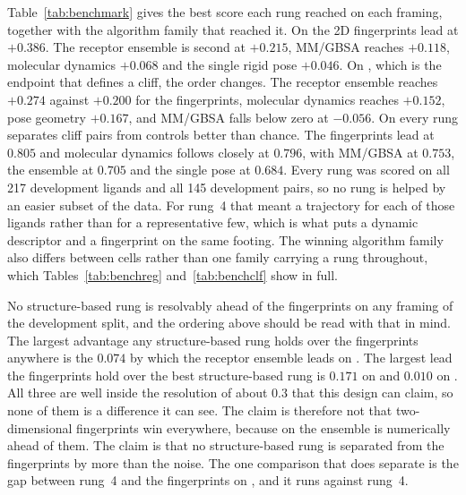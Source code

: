 Table~\ref{tab:benchmark} gives the best score each rung reached on each framing,
together with the algorithm family that reached it. On \framingA{} the 2D fingerprints
lead at $+0.386$. The receptor ensemble is second at $+0.215$, MM/GBSA reaches
$+0.118$, molecular dynamics $+0.068$ and the single rigid pose $+0.046$. On
\framingB{}, which is the endpoint that defines a cliff, the order changes. The
receptor ensemble reaches $+0.274$ against $+0.200$ for the fingerprints, molecular
dynamics reaches $+0.152$, pose geometry $+0.167$, and MM/GBSA falls below zero at
$-0.056$. On \framingC{} every rung separates cliff pairs from controls better than
chance. The fingerprints lead at $0.805$ and molecular dynamics follows closely at
$0.796$, with MM/GBSA at $0.753$, the ensemble at $0.705$ and the single pose at
$0.684$. Every rung was scored on all 217 development ligands and all 145 development
pairs, so no rung is helped by an easier subset of the data. For rung~4 that meant a
trajectory for each of those ligands rather than for a representative few, which is
what puts a dynamic descriptor and a fingerprint on the same footing. The winning algorithm
family also differs between cells rather than one family carrying a rung throughout,
which Tables~\ref{tab:benchreg} and~\ref{tab:benchclf} show in full.

\begin{table}[tb]
  \centering
  \caption{\textbf{Best score per rung on each framing}, over the rung's descriptor
    arms and the algorithm families, with the winning family in parentheses. The full
    grid is in the supplementary tables.}
  \label{tab:benchmark}
  
\end{table}

No structure-based rung is resolvably ahead of the fingerprints on any framing of the
development split, and the ordering above should be read with that in mind. The largest advantage any
structure-based rung holds over the fingerprints anywhere is the $0.074$ by which the
receptor ensemble leads on \framingB{}. The largest lead the fingerprints hold over the
best structure-based rung is $0.171$ on \framingA{} and $0.010$ on \framingC{}. All
three are well inside the resolution of about $0.3$ that this design can claim, so none
of them is a difference it can see. The claim is therefore not that two-dimensional
fingerprints win everywhere, because on \framingB{} the ensemble is numerically ahead
of them. The claim is that no structure-based rung is separated from the fingerprints by more
than the noise.
The one comparison that does separate is the gap between rung~4 and the fingerprints on
\framingA{}, and it runs against rung~4.

